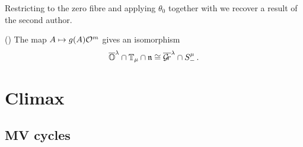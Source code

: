 \documentclass[draft]{article} %
\begin{document}
% 
% 
% 

Restricting to the zero fibre and applying $\theta_0$ together with  we recover a result of the second author. 
% 
% 
\begin{corollary}
    \label{cor:mvy} (\cite[Corollary~5.2.2]{dthesis})
The map $ A \mapsto g(A)\mathcal O^m$ gives an isomorphism 
$$\overline{\mathbb O}^\lambda \cap \mathbb T_\mu\cap\mathfrak n \cong\overline{\mathcal{G}\!r}^\lambda\cap S^\mu_-\,.$$
\end{corollary}
% 


\section{Climax}
\label{s:climax}
\subsection{MV cycles}
\label{ss:mvcs}
\end{document}

